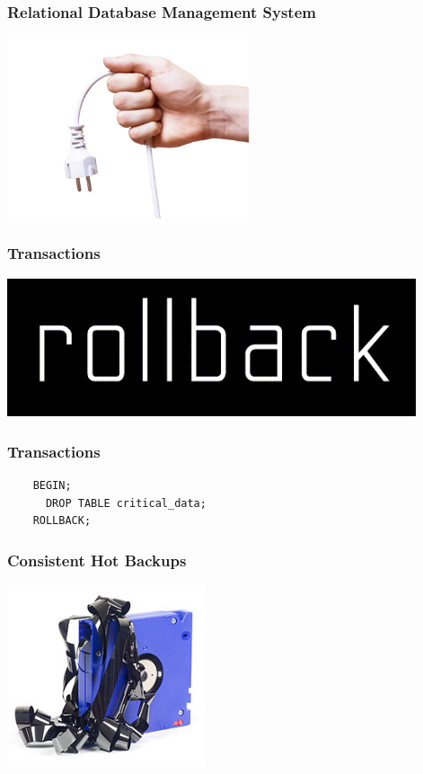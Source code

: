 \documentclass{beamer}
\begin{document}
\begin{frame}
  \frametitle{Relational Database Management System}

  
  \begin{center}
    \includegraphics[height=2.1in]{cord-unplugged.jpg}
  \end{center}
\end{frame}

\begin{frame}
  \frametitle{Transactions}


  \begin{center}
    \includegraphics[height=1.6in]{rollback-wordmark.png}
  \end{center}
\end{frame}

\begin{frame}[fragile]
  \frametitle{Transactions}

  \begin{verbatim}
    BEGIN;
      DROP TABLE critical_data;
    ROLLBACK;
  \end{verbatim}
\end{frame}

\begin{frame}
  \frametitle{Consistent Hot Backups}


  \begin{center}
    \includegraphics[height=2.1in]{online-backup.jpg}
  \end{center}
\end{frame}
\end{document}
